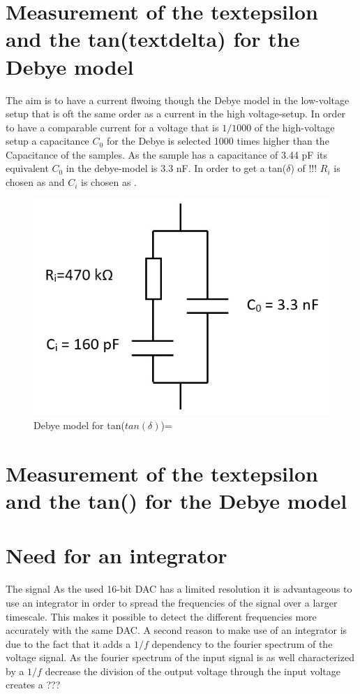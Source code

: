\section{Measurement of the textepsilon and the tan(textdelta) for the Debye model}

The aim is to have a current flwoing though the Debye model in the low-voltage setup that is oft the same order as a current in the high voltage-setup. In order to have a comparable current for a voltage that is $1/1000$ of the high-voltage setup a capacitance $C_0$ for the Debye is selected 1000 times higher than the Capacitance of the samples. As the sample has a capacitance of 3.44 pF its equivalent $C_0$ in the debye-model is 3.3 nF. In order to get a tan($\delta$) of !!! $R_i$ is chosen as and $C_i$ is chosen as .
\begin{figure}
	\includegraphics{figures/Methods/debye-modell.jpg}	
	\caption{Debye model for tan($tan(\delta)$)= }	
\end{figure}


\section{Measurement of the textepsilon and the tan(\textdelta) for the Debye model}




\section{Need for an integrator}
The signal 
As the used 16-bit DAC has a limited resolution it is advantageous to use an integrator in order to spread the frequencies of the signal over a larger timescale. This makes it possible to detect the different frequencies more accurately with the same DAC. 
A second reason to make use of an integrator is due to the fact that it adds a $1/f$ dependency to the fourier spectrum of the voltage signal. As the fourier spectrum of the input signal is as well characterized by a $1/f$ decrease the division of the output voltage through the input voltage creates a ???
\newpage

